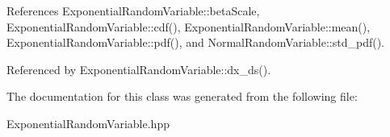 References Exponential\+Random\+Variable\+::beta\+Scale, Exponential\+Random\+Variable\+::cdf(), Exponential\+Random\+Variable\+::mean(), Exponential\+Random\+Variable\+::pdf(), and Normal\+Random\+Variable\+::std\+\_\+pdf().



Referenced by Exponential\+Random\+Variable\+::dx\+\_\+ds().



The documentation for this class was generated from the following file\+:\begin{DoxyCompactItemize}
\item 
Exponential\+Random\+Variable.\+hpp\end{DoxyCompactItemize}
